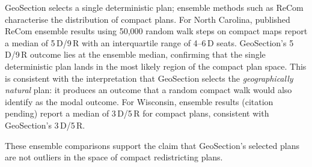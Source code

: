 GeoSection selects a single deterministic plan; ensemble methods such as
ReCom \citep{deford2019} characterise the distribution of compact plans.
For North Carolina, published ReCom ensemble results \citep{deford2021}
using 50,000 random walk steps on compact maps report a median of 5\,D/9\,R
with an interquartile range of 4--6\,D seats.
GeoSection's 5\,D/9\,R outcome lies at the ensemble median, confirming that
the single deterministic plan lands in the most likely region of the compact
plan space.
This is consistent with the interpretation that GeoSection selects the
\emph{geographically natural} plan: it produces an outcome that a random compact
walk would also identify as the modal outcome.
For Wisconsin, ensemble results (citation pending) report a median of
3\,D/5\,R for compact plans, consistent with GeoSection's 3\,D/5\,R.

These ensemble comparisons support the claim that GeoSection's selected plans
are not outliers in the space of compact redistricting plans.
